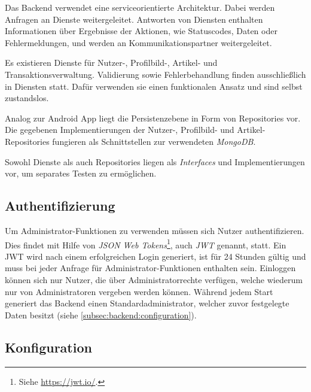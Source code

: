 \documentclass[a4paper, 11pt]{article}
\begin{document}
Das Backend verwendet eine serviceorientierte Architektur.
Dabei werden Anfragen an Dienste weitergeleitet.
Antworten von Diensten enthalten Informationen über Ergebnisse der Aktionen, wie Statuscodes, Daten oder Fehlermeldungen, und werden an Kommunikationspartner weitergeleitet.

Es existieren Dienste für Nutzer-, Profilbild-, Artikel- und Transaktionsverwaltung.
Validierung sowie Fehlerbehandlung finden ausschließlich in Diensten statt.
Dafür verwenden sie einen funktionalen Ansatz und sind selbst zustandslos.

Analog zur Android App liegt die Persistenzebene in Form von Repositories vor.
Die gegebenen Implementierungen der Nutzer-, Profilbild- und Artikel-Repositories fungieren als Schnittstellen zur verwendeten \textit{MongoDB}.

Sowohl Dienste als auch Repositories liegen als \textit{Interfaces} und Implementierungen vor, um separates Testen zu ermöglichen.

\subsection{Authentifizierung}
\label{subsec:backend:authentication}

Um Administrator-Funktionen zu verwenden müssen sich Nutzer authentifizieren.
Dies findet mit Hilfe von \textit{JSON Web Tokens}\footnote{Siehe \url{https://jwt.io/}.}, auch \textit{JWT} genannt, statt.
Ein JWT wird nach einem erfolgreichen Login generiert, ist für 24 Stunden gültig und muss bei jeder Anfrage für Administrator-Funktionen enthalten sein.
Einloggen können sich nur Nutzer, die über Administratorrechte verfügen, welche wiederum nur von Administratoren vergeben werden können.
Während jedem Start generiert das Backend einen Standard\-administrator, welcher zuvor festgelegte Daten besitzt (siehe \autoref{subsec:backend:configuration}).

\subsection{Konfiguration}
\label{subsec:backend:configuration}
\end{document}

